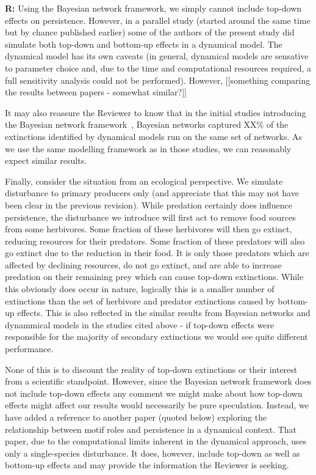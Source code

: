 \documentclass[12pt]{article}
\begin{document}
\begin{enumerate}
                \textbf{R:} Using the Bayesian network framework, we simply cannot include top-down effects on persistence. However, in a parallel study (started around the same time but by chance published earlier) some of the authors of the present study did simulate both top-down and bottom-up effects in a dynamical model. The dynamical model has its own caveats (in general, dynamical models are sensative to parameter choice and, due to the time and computational resources required, a full sensitivity analysis could not be performed). However, [[something comparing the results between papers - somewhat similar?]]


                It may also reassure the Reviewer to know that in the initial studies introducing the Bayesian network framework~\citep{}, Bayesian networks captured XX\% of the extinctions identified by dynamical models run on the same set of networks. As we use the same modelling framework as in those studies, we can reasonably expect similar results.


                Finally, consider the situation from an ecological perspective. We simulate disturbance to primary producers only (and appreciate that this may not have been clear in the previous revision). While predation certainly does influence persistence, the disturbance we introduce will first act to remove food sources from some herbivores. Some fraction of these herbivores will then go extinct, reducing resources for their predators. Some fraction of these predators will also go extinct due to the reduction in their food. It is only those predators which are affected by declining resources, do not go extinct, and are able to increase predation on their remaining prey which can cause top-down extinctions. While this obviously does occur in nature, logically this is a smaller number of extinctions than the set of herbivore and predator extinctions caused by bottom-up effects. This is also reflected in the similar results from Bayesian networks and dynammical models in the studies cited above - if top-down effects were responsible for the majority of secondary extinctions we would see quite different performance.


                None of this is to discount the reality of top-down extinctions or their interest from a scientific standpoint. However, since the Bayesian network framework does not include top-down effects any comment we might make about how top-down effects might affect our results would necessarily be pure speculation. Instead, we have added a reference to another paper (quoted below) exploring the relationship between motif roles and persistence in a dynamical context. That paper, due to the computational limits inherent in the dynamical approach, uses only a single-species disturbance. It does, however, include top-down as well as bottom-up effects and may provide the information the Reviewer is seeking.



\end{enumerate}
\end{document}
